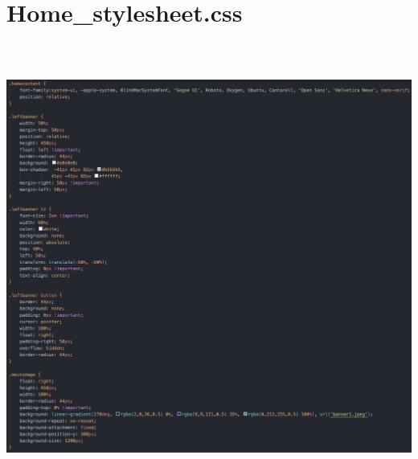 \section*{Home\_stylesheet.css}\includegraphics[width=6.26806in,height=5.77639in]{ch6_appendix/media/image29.png}

